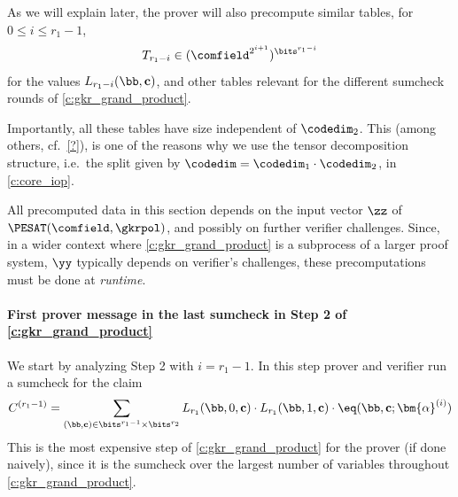 As we will explain later, the prover will also precompute  similar tables, for $0\leq i\leq r_1-1$, $$T_{r_1-i}\in (\comfield^{2^{i+1}})^{\bits^{r_1-i}}$$ for the values $L_{r_1-i}(\bb,\cc)$, and other tables relevant for the different sumcheck rounds of \cref{c:gkr_grand_product}. 

Importantly, all these tables have size independent of $\codedim_2$.  This (among others, cf.\ \cref{?}), is one of the reasons why we use the tensor decomposition structure, i.e.\ the split given by $\codedim=\codedim_1\cdot \codedim_2$, in \cref{c:core_iop}.

\begin{remark}
    All precomputed data in this section depends on the input vector $\zz$ of $\PESAT(\comfield,\gkrpol)$, and possibly on further verifier challenges. Since, in a wider context where \cref{c:gkr_grand_product} is a subprocess of a larger proof system, $\yy$ typically depends on verifier's challenges, these precomputations must be done at \emph{runtime}. 
\end{remark}



\paragraph{First prover message in the last sumcheck in Step 2 of \cref{c:gkr_grand_product}}
We start by analyzing Step 2 with $i=r_1-1$. In this step prover and verifier run a sumcheck for the claim
%
$$
C^{(r_1-1)}= \sum_{(\bb,\cc)\in \bits^{r_1-1}\times \bits^{r_2}} L_{r_1}(\bb,0,\cc) \cdot L_{r_1}(\bb,1,\cc) \cdot \eq(\bb,\cc;\bm{\alpha}^{(i)})
$$
%
This is the most expensive step of \cref{c:gkr_grand_product} for the prover (if done naively), since it is the sumcheck over the largest number of variables throughout \cref{c:gkr_grand_product}. 

